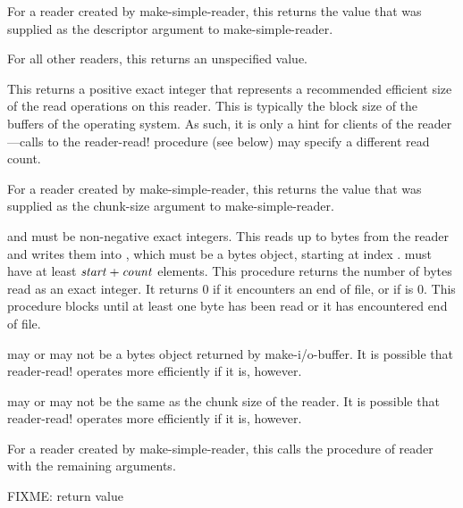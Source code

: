 \begin{entry}{%
}
   
For a reader created by {\cf make-simple-reader}, this returns the value that was
supplied as the descriptor argument to {\cf make-simple-reader}.
   
For all other readers, this returns an unspecified value.
\end{entry}

\begin{entry}{%
}
   
This returns a positive exact integer that represents a recommended
efficient size of the read operations on this reader. This is typically the
block size of the buffers of the operating system. As such, it is only a
hint for clients of the reader---calls to the {\cf reader-read!} procedure (see
below) may specify a different read count.

For a reader created by {\cf make-simple-reader}, this returns the
value that was supplied as the chunk-size argument to {\cf
  make-simple-reader}.
\end{entry}

\begin{entry}{%
}
   
 and  must be non-negative exact integers. This
reads up to  bytes from the reader and writes them into
, which must be a bytes object, starting at index
.  must have at least $\var{start} +
\var{count}$ elements. This procedure returns the number of bytes read
as an exact integer. It returns 0 if it encounters an end of file, or
if  is 0.  This procedure blocks until at least one byte has been
read or it has encountered end of file.
   
 may or may not be a bytes object returned by {\cf
  make-i/o-buffer}. It is possible that {\cf reader-read!} operates
more efficiently if it is, however.
   
 may or may not be the same as the chunk size of the
reader. It is possible that {\cf reader-read!} operates more
efficiently if it is, however.
   
For a reader created by {\cf make-simple-reader}, this calls the
 procedure of reader with the remaining arguments.

FIXME: return value
\end{entry}

